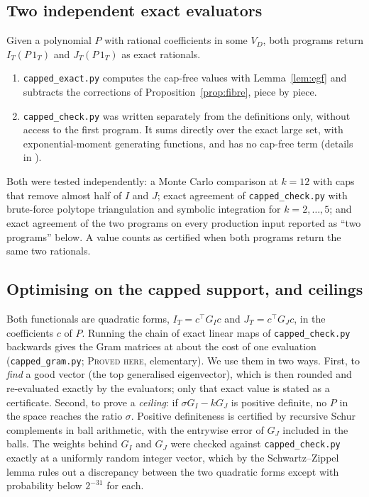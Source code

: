 \documentclass[11pt]{amsart}
\theoremstyle{definition}
\theoremstyle{remark}
\newcommand{\lbl}[1]{\textup{\textsc{#1}}}
\begin{document}
\subsection*{Two independent exact evaluators}
Given a polynomial $P$ with rational coefficients in some $V_D$, both
programs return $I_T(P\,1_T)$ and $J_T(P\,1_T)$ as exact rationals.
\begin{enumerate}
\item \texttt{capped\_exact.py} computes the cap-free values with
Lemma~\ref{lem:egf} and subtracts the corrections of
Proposition~\ref{prop:fibre}, piece by piece.
\item \texttt{capped\_check.py} was written separately from the definitions
only, without access to the first program. It sums directly over the exact
large set, with exponential-moment generating functions, and has no cap-free
term (details in \cite[\S5]{Kim26}).
\end{enumerate}
Both were tested independently: a Monte Carlo comparison at $k=12$ with caps
that remove almost half of $I$ and $J$; exact agreement of
\texttt{capped\_check.py} with brute-force polytope triangulation and symbolic
integration for $k=2,\dots,5$; and exact agreement of the two programs on every
production input reported as ``two programs'' below. A value counts as
certified when both programs return the same two rationals.

\subsection*{Optimising on the capped support, and ceilings}
Both functionals are quadratic forms, $I_T=c^\top G_Ic$ and $J_T=c^\top G_Jc$,
in the coefficients $c$ of $P$. Running the chain of exact linear maps of
\texttt{capped\_check.py} backwards gives the Gram matrices at about the cost
of one evaluation (\texttt{capped\_gram.py}; \lbl{Proved here}, elementary).
We use them in two ways. First, to \emph{find} a good vector (the top
generalised eigenvector), which is then rounded and re-evaluated exactly by
the evaluators; only that exact value is stated as a certificate. Second, to
prove a \emph{ceiling}: if $\sigma G_I-kG_J$ is positive definite, no $P$ in
the space reaches the ratio $\sigma$. Positive definiteness is certified by
recursive Schur complements in ball arithmetic, with the entrywise error of
$G_J$ included in the balls. The weights behind $G_I$ and $G_J$ were checked
against \texttt{capped\_check.py} exactly at a uniformly random integer
vector, which by the Schwartz--Zippel lemma rules out a discrepancy between
the two quadratic forms except with probability below $2^{-31}$ for each.
\end{document}
